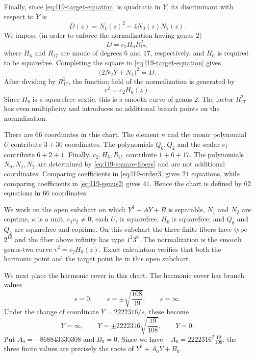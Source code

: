 \documentclass[10pt]{amsart}
\numberwithin{equation}{section}
\theoremstyle{definition}
\theoremstyle{remark}
\begin{document}
  Finally, since \eqref{eq:l19-target-equation} is quadratic in $Y$, its
  discriminant with respect to $Y$ is
  \[
   D(z)=N_1(z)^2-4N_0(z)N_2(z).
  \]
  We impose (in order to enforce the normalization having genus $2$)
  \begin{equation}\label{eq:l19-genus2}
   D=c_2H_6R_{17}^2,
  \end{equation}
  where $H_6$ and $R_{17}$ are monic of degrees $6$ and $17$, respectively,
  and $H_6$ is required to be squarefree.  Completing the square in
  \eqref{eq:l19-target-equation} gives
  \[
   \bigl(2N_2Y+N_1\bigr)^2=D.
  \]
  After dividing by $R_{17}^2$, the function field of the normalization is generated by
  \[
   v^2=c_2H_6(z).
  \]
  Since $H_6$ is a squarefree sextic, this is a smooth curve of genus $2$.
  The factor $R_{17}^2$ has even multiplicity and introduces no additional
  branch points on the normalization.

  There are $66$ coordinates in this chart.  The element $\kappa$ and the
  monic polynomial $U$ contribute $3+30$ coordinates.  The polynomials
  $Q_6,Q_2$ and the scalar $c_1$ contribute $6+2+1$.  Finally,
  $c_2,H_6,R_{17}$ contribute $1+6+17$.  The polynomials $N_0,N_1,N_2$ are
  determined by \eqref{eq:l19-square-fibers} and are not additional
  coordinates.  Comparing coefficients in \eqref{eq:l19-order3} gives
  $21$ equations, while comparing coefficients in
  \eqref{eq:l19-genus2} gives $41$.  Hence the chart is defined by
  $62$ equations in $66$ coordinates.

  We work on the open subchart on which $Y^3+AY+B$ is separable, $N_1$ and $N_2$ are coprime,
  $\kappa$ is a unit, $c_1c_2\ne0$, each $U_i$ is squarefree, $H_6$ is
  squarefree, and $Q_6$ and $Q_2$ are squarefree and coprime.  On this subchart the three finite fibers have type $2^{10}$ and the fiber above
  infinity has type $1^2 3^6$. The normalization is the smooth
  genus-two curve $v^2=c_2H_6(z)$.  Exact calculation verifies that both
  the harmonic point and the target point lie in this open subchart.

We next place the harmonic cover in this chart. The harmonic cover has branch values
  \[
  s=0,\qquad s=\pm\sqrt{\frac{108}{19}},\qquad s=\infty.
  \]
  Under the change of coordinate $Y=2222316/s$, these become
  \[
  Y=\infty,\qquad
  Y=\pm2222316\sqrt{\frac{19}{108}},\qquad Y=0.
  \]
  Put $A_0=-868843330308$ and $B_0=0$. Since we have $-A_0=2222316^2\frac{19}{108}$, the three finite values are precisely the roots of $Y^3+A_0Y+B_0$.
\end{document}
